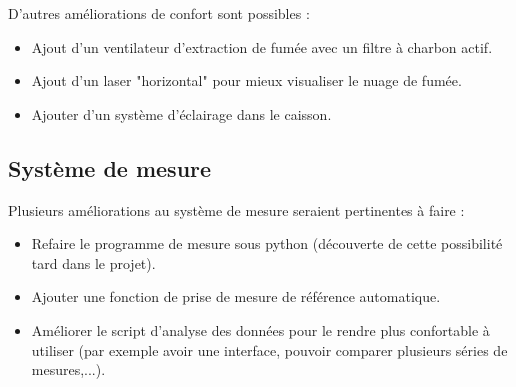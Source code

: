 D'autres améliorations de confort sont possibles :
\begin{itemize}
    \item Ajout d'un ventilateur d'extraction de fumée avec un filtre à charbon actif.
    \item Ajout d'un laser "horizontal" pour mieux visualiser le nuage de fumée.
    \item Ajouter d'un système d'éclairage dans le caisson.
\end{itemize}

\subsection{Système de mesure}
Plusieurs améliorations au système de mesure seraient pertinentes à faire :
\begin{itemize}
    \item Refaire le programme de mesure sous python (découverte de cette possibilité tard dans le projet).
    \item Ajouter une fonction de prise de mesure de référence automatique.
    \item Améliorer le script d'analyse des données pour le rendre plus confortable à utiliser (par exemple avoir une interface, pouvoir comparer plusieurs séries de mesures,...).
\end{itemize}
